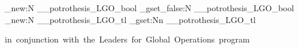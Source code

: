 \bool_new:N        \g__potrothesis_LGO_bool
\bool_gset_false:N \g__potrothesis_LGO_bool
\tl_new:N          \g__potrothesis_LGO_tl
\tl_gset:Nn        \g__potrothesis_LGO_tl { in~conjunction~with~the~Leaders~for~Global~Operations~program \par }

\NewDocumentCommand{}

\NewDocumentCommand{}
\ExplSyntaxOff